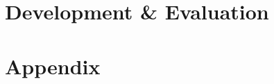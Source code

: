 \part{Development \& Evaluation} %



\appendix

\part{Appendix} %



\cleardoublepage %


\cleardoublepage %

\cleartoleftpage %


